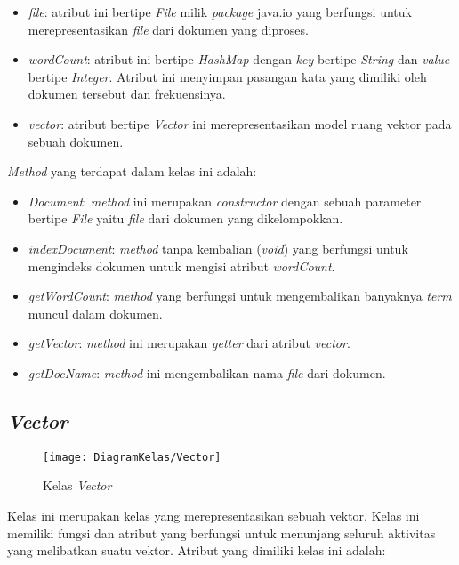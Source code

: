 \begin{itemize}
	\item \textit{file}: atribut ini bertipe \textit{File} milik \textit{package} java.io yang berfungsi untuk merepresentasikan \textit{file} dari dokumen yang diproses.
	\item \textit{wordCount}: atribut ini bertipe \textit{HashMap} dengan \textit{key} bertipe \textit{String} dan \textit{value} bertipe \textit{Integer}. Atribut ini menyimpan pasangan kata yang dimiliki oleh dokumen tersebut dan frekuensinya.
	\item \textit{vector}: atribut bertipe \textit{Vector} ini merepresentasikan model ruang vektor pada sebuah dokumen.
\end{itemize}

\textit{Method} yang terdapat dalam kelas ini adalah:

\begin{itemize}
	\item \textit{Document}: \textit{method} ini merupakan \textit{constructor} dengan sebuah parameter bertipe \textit{File} yaitu \textit{file} dari dokumen yang dikelompokkan.
	\item \textit{indexDocument}: \textit{method} tanpa kembalian (\textit{void}) yang berfungsi untuk mengindeks dokumen untuk mengisi atribut \textit{wordCount}.
	\item \textit{getWordCount}: \textit{method} yang berfungsi untuk mengembalikan banyaknya \textit{term} muncul dalam dokumen.
	\item \textit{getVector}: \textit{method} ini merupakan \textit{getter} dari atribut \textit{vector}.
	\item \textit{getDocName}: \textit{method} ini mengembalikan nama \textit{file} dari dokumen.
\end{itemize}

\subsection{\textit{Vector}}

\begin{figure}[H]
	\begin{center}
		\texttt{[image: DiagramKelas/Vector]}
		\caption{Kelas \textit{Vector}}
		\label{fig:kelasVector}
	\end{center}
\end{figure}

Kelas ini merupakan kelas yang merepresentasikan sebuah vektor. Kelas ini memiliki fungsi dan atribut yang berfungsi untuk menunjang seluruh aktivitas yang melibatkan suatu vektor. Atribut yang dimiliki kelas ini adalah:

